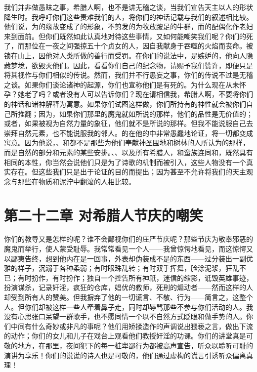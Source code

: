 我们并非做愚昧之事，希腊人啊，也不是讲无稽之谈，当我们宣告天主以人的形状降生时。我呼吁你们这些责难我们的人，将你们的神话记载与我们的叙述相比较。他们说，为的缘故变成了的形象，不剪发的为牧放跛足的牛群，而的配偶化作老妇来到面前。但你们既然如此认真地对待这些事情，又如何能嘲笑我们呢？你们的死了，而那位在一夜之间强掠五十个贞女的人，因自我献身于吞噬的火焰而丧命。被锁在山上，因他对人类所做的善行而受罚。在你们的说法中，是嫉妒的，他向人隐藏梦境，欲毁灭他们。因此，看看你们自己的纪念物，请赐予我们赞许，即便只是将其视作与你们相似的传说。然而，我们并不行愚妄之事，你们的传说不过是无稽之谈。如果你们谈论诸神的起源，你们也宣称他们是有死的。为什么现在从未怀孕？她老了吗？或者没有人可以告诉你们？现在请相信我，希腊人啊，不要将你们的神话和诸神解释为寓意。如果你们试图这样做，你们所持有的神性就会被你们自己所推翻；因为，如果你们那里的魔鬼就如所说的那样，他们的品性是无价值的；或者，如果被视为自然力量的象征，他们就不是所说的那样。但我不能说服自己去崇拜自然元素，也不能说服我的邻人。的在他的中非常愚蠢地论证，将一切都变成寓意。因为他说，、和都不是那些为他们奉献神圣围地和树林的人所认为的那样，而是自然的部分和元素的某些安排。、、以及所有希腊人，和蛮族连同和，既然具有相同的本性，你当然会说他们只是为了诗歌的机制而被引入，这些人物没有一个真实存在。但这些我们只是出于论证的目的而提出；因为甚至不允许将我们的天主观念与那些在物质和泥泞中翻滚的人相比较。\par


\section{第二十二章 对希腊人节庆的嘲笑}

你们的教导又是怎样的呢？谁不会鄙视你们的庄严节庆呢？那些节庆为敬奉邪恶的魔鬼而举行，使人蒙受耻辱。我常常看见一个人——我曾惊愕地看见，而这惊愕又以鄙夷告终，想到他内在是一回事，外表却伪装成不是的东西——过分装出一副优雅的样子，沉溺于各种柔弱；有时眼珠乱转；有时双手挥舞，脸涂泥浆，狂乱不已；有时扮作，有时扮作；独自一个控告所有神祇，迷信的缩影，诋毁英雄事迹，扮演谋杀，记录奸淫，疯狂的仓库，娼优的教师，死刑的煽动者——然而这样的人却受到所有人的赞美。但我摒弃了他的一切谎言、不敬、行为——简言之，这整个人。但你们却被这样一些人牵着鼻子走，同时却辱骂那些不参与你们活动的人。我没有心思张口呆望一群歌手，也不愿同情一个以不自然方式眨眼和做手势的人。你们中间有什么奇妙或非凡的事呢？他们用矫揉造作的声调说出猥亵之言，做出下流的动作；你们的女儿和儿子在戏台上观看他们教授奸淫的功课。你们的讲堂真是可敬的地方，在那里，夜间犯下的每一桩卑鄙行为都被高声宣告，听众以聆听可耻的演讲为享乐！你们的说谎的诗人也是可敬的，他们通过虚构的谎言引诱听众偏离真理！\par

